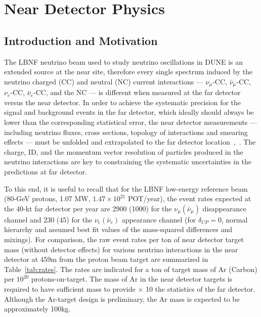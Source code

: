 
\chapter{Near Detector Physics}
\label{ch:physics-nd}

\section{Introduction and Motivation}
\label{sec:physics-nd-introduction}

The LBNF neutrino beam used to study neutrino oscillations in DUNE is
an extended source at the near site, therefore every single spectrum
induced by the neutrino charged (CC) and neutral (NC) current
interactions --- $\nu_\mu$-CC, $\bar \nu_\mu$-CC, $\nu_e$-CC, $\bar
\nu_e$-CC, and the NC --- is different when measured at the far
detector versus the near detector.  In order to achieve the systematic
precision for the signal and background events in the far detector,
which ideally should always be lower than the corresponding
statistical error, the near detector measurements --- including
neutrino fluxes, cross sections, topology of interactions and smearing
effects --- must be unfolded and extrapolated to the far detector
location~\cite{near-detector-REQ1},~\cite{near-detector-REQ2}.  The
charge, ID, and the momentum vector resolution of particles produced
in the neutrino interactions are %
key to constraining the systematic uncertainties in the predictions at
far detector.
%

To this end, it is useful to recall that for the LBNF low-energy reference beam
(80-GeV protons, 1.07 MW, $1.47 \times 10^{21} $ POT/year), the 
event rates expected at the 40-kt far detector per year are 
2900 (1000) for the $\nu_\mu (\bar \nu_\mu)$
disappearance channel and 230 (45) for the $\nu_e(\bar \nu_e)$
appearance channel (for $\delta_{CP}=0$, normal hierarchy and assumed best fit values of
the mass-squared differences and mixings). For comparison, the raw
event rates per ton of near detector target mass (without detector
effects) for various neutrino interactions in the near detector at
459m from the proton beam target are summarized in
Table~\ref{tab:rates}. The rates are indicated for a ton of target
mass of Ar (Carbon) per $10^{20}$ protons-on-target.  The mass of Ar
in the near detector targets is required to have sufficient mass to
provide $\times$ 10 the statistics of the far detector. Although the
Ar-target design is preliminary, the Ar mass is expected to be
approximately 100kg.

